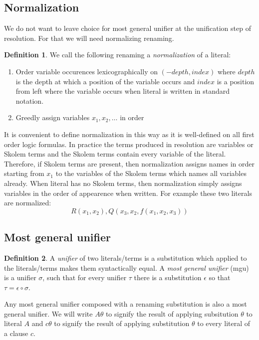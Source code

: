 \documentclass[english, shortabstract]{iithesis}
\theoremstyle{definition} \newtheorem{definition}{Definition}[chapter]
\theoremstyle{remark} \newtheorem{remark}[definition]{Observation}
\theoremstyle{plain} \newtheorem{theorem}[definition]{Theorem}
\theoremstyle{plain} \newtheorem{lemma}[definition]{Lemma}
\begin{document}
\subsection{Normalization}
We do not want to leave choice for most general unifier at the unification step of resolution.
For that we will need normalizing renaming.

\begin{definition}
We call the following renaming a \emph{normalization} of a literal:
\begin{enumerate}
    \item Order variable occurences lexicographically on $(-\mathit{depth}, \mathit{index})$ 
    where $\mathit{depth}$ is the depth at which a position of the variable occurs and $\mathit{index}$ is a position from left where the variable occurs when literal is written in standard notation.
    \item Greedly assign variables $x_1, x_2, \dots$ in order
\end{enumerate}
\end{definition}

It is convenient to define normalization in this way as it is well-defined on all first order logic formulas.
In practice the terms produced in resolution are variables or Skolem terms and the Skolem terms contain every variable of the literal.
Therefore, if Skolem terms are present, then normalization assigns names in order 
starting from $x_1$ to the variables of the Skolem terms which names all variables already.
When literal has no Skolem terms, then normalization simply assigns variables in the order of appearence when written.
For example these two literals are normalized: $$R(x_1,x_2), Q(x_3, x_2, f(x_1,x_2, x_3))$$

\subsection{Most general unifier}
\begin{definition}\label{def:mgu}
A \emph{unifier} of two literals/terms is a substitution which applied to the literals/terms makes them syntactically equal. 
A \emph{most general unifier} (mgu) is a unifier $\sigma$, such that for every unifier $\tau$ there is a substitution $\epsilon$ so that $\tau=\epsilon\circ\sigma$.
\end{definition}
Any most general unifier composed with a renaming substitution is also a most general unifier.
We will write $A\theta$ to signify the result of applying subsitution $\theta$ to literal $A$
and $c\theta$ to signify the result of applying substitution $\theta$ to every literal of a clause $c$.
\end{document}
